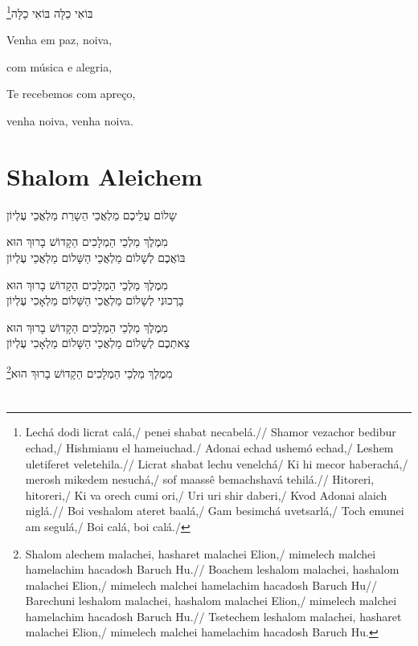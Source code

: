 בּוֹאִי כַלָּה בּוֹאִי כַלָּה\footnote{Lechá dodi licrat calá,/ penei shabat necabelá.// Shamor vezachor bedibur echad,/ Hishmianu el hameiuchad./ Adonai echad ushemó echad,/ Leshem uletiferet veletehila.//
Licrat shabat lechu venelchá/ Ki hi mecor haberachá,/ merosh mikedem nesuchá,/ sof maassê bemachshavá tehilá.// Hitoreri, hitoreri,/ Ki va orech cumi ori,/ Uri uri shir daberi,/
Kvod Adonai alaich niglá.// Boi veshalom ateret baalá,/ Gam besimchá uvetsarlá,/
Toch emunei am segulá,/ Boi calá, boi calá./}

\movetooddpage
\raggedright

Venha em paz, noiva,

com música e alegria,

Te recebemos com apreço,

venha noiva, venha noiva.

\movetoevenpage
\raggedleft

\section{Shalom Aleichem}

שָלוֹם עֲלֵיכֶם מַלְאֲכֵי הַשָרֵת מַלְאֲכֵי עֶלְיוֹן

מִמֶלֶךְ מַלְכֵי הַמְלָכִים הַקָדוֹשׁ בָרוּךְ הוּא\\[10pt]

בּוֹאֲכֶם לְשָׁלוֹם מַלְאֲכֵי הַשָּׁלוֹם מַלְאֲכֵי עֶלְיוֹן

מִמֶלֶךְ מַלְכֵי הַמְלָכִים הַקָדוֹשׁ בָרוּךְ הוּא\\[10pt]

בָרְכוּנִי לְשָלוֹם מַלְאֲכֵי הַשָּׁלוֹם מַלְאָכִי עֶלְיוֹן

מִמֶלֶךְ מַלְכֵי הַמְלָכִים הַקָדוֹשׁ בָרוּךְ הוּא\\[10pt]

צֵאתְכֶם לְשָלוֹם מַלְאֲכֵי הַשָּׁלוֹם מַלְאָכִי עֶלְיוֹן

מִמֶלֶךְ מַלְכֵי הַמְלָכִים הַקָדוֹשׁ בָרוּךְ הוּא\footnote{
Shalom alechem malachei, hasharet malachei Elion,/
mimelech malchei hamelachim hacadosh Baruch Hu.//
Boachem leshalom malachei, hashalom malachei Elion,/
mimelech malchei hamelachim hacadosh Baruch Hu//
Barechuni leshalom malachei, hashalom malachei Elion,/
mimelech malchei hamelachim hacadosh Baruch Hu.//
Tsetechem leshalom malachei, hasharet malachei Elion,/
mimelech malchei hamelachim hacadosh Baruch Hu.}

\movetooddpage
\raggedright

\section{}

